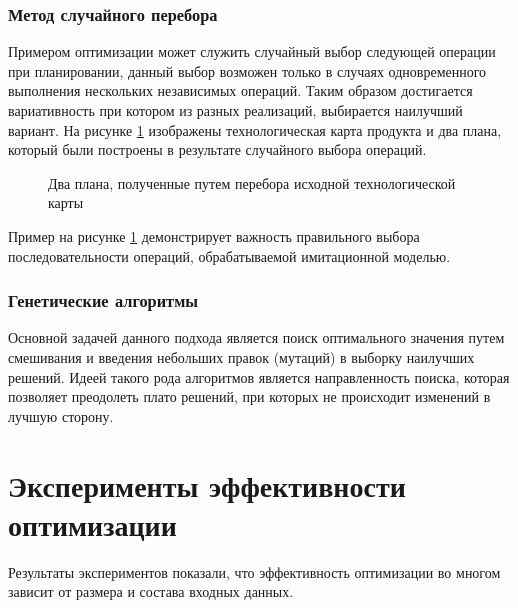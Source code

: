 \subsubsection*{Метод случайного перебора}
Примером оптимизации может служить случайный выбор следующей операции при планировании, данный выбор возможен только в случаях одновременного выполнения нескольких независимых операций. Таким образом достигается вариативность при котором из разных реализаций, выбирается наилучший вариант. На рисунке \ref{ris:Force} изображены технологическая карта продукта и два плана, который были построены в результате случайного выбора операций.

\begin{figure}[H]
    \caption{Два плана, полученные путем перебора исходной технологической карты}
    \label{ris:Force}
\end{figure}

Пример на рисунке \ref{ris:Force} демонстрирует важность правильного выбора последовательности операций, обрабатываемой имитационной моделью. 

\subsubsection*{Генетические алгоритмы}
Основной задачей данного подхода является поиск оптимального значения путем смешивания и введения небольших правок (мутаций) в выборку наилучших решений.
Идеей такого рода алгоритмов является направленность поиска, которая позволяет преодолеть плато решений, при которых не происходит изменений в лучшую сторону. 


\section*{Эксперименты эффективности оптимизации}
\label{experiment}
Результаты экспериментов показали, что эффективность оптимизации во многом зависит от размера и состава входных данных.


